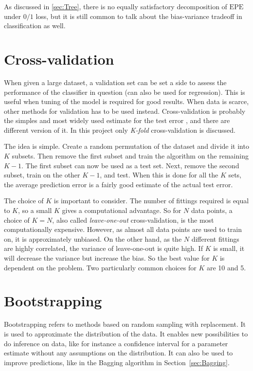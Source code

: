 As discussed in \ref{sec:Tree}, there is no equally satisfactory decomposition of $\mathrm{EPE}$ under $0/1$ loss, but it is still common to talk about the bias-variance tradeoff in classification as well.



\section{Cross-validation}
\label{sec:Cross-validation}
When given a large dataset, a validation set can be set a side to assess the performance of the classifier in question (can also be used for regression). This is useful when tuning of the model is required for good results. When data is scarce, other methods for validation has to be used instead. Cross-validation is probably the simples and most widely used estimate for the test error \citep{modstat}, and there are different version of it. In this project only \textit{K-fold} cross-validation is discussed. 

The idea is simple. Create a random permutation of the dataset and divide it into $K$ subsets. Then remove the first subset and train the algorithm on the remaining $K-1$. The first subset can now be used as a test set. Next, remove the second subset, train on the other $K-1$, and test. When this is done for all the $K$ sets, the average prediction error is a fairly good estimate of the actual test error. 

The choice of $K$ is important to consider. The number of fittings required is equal to $K$, so a small $K$ gives a computational advantage. So for $N$ data points, a choice of $K = N$, also called \textit{leave-one-out} cross-validation, is the most computationally expensive. However, as almost all data points are used to train on, it is approximately unbiased. On the other hand, as the $N$ different fittings are highly correlated, the variance of leave-one-out is quite high. If $K$ is small, it will decrease the variance but increase the bias. So the best value for $K$ is dependent on the problem. Two particularly common choices for $K$ are 10 and 5.


\section{Bootstrapping}
\label{sec:Bootstrapping}
Bootstrapping refers to methods based on random sampling with replacement. It is used to approximate the distribution of the data. It enables new possibilities to do inference on data, like for instance a confidence interval for a parameter estimate without any assumptions on the distribution. It can also be used to improve predictions, like in the Bagging algorithm in Section~\ref{sec:Bagging}. 


